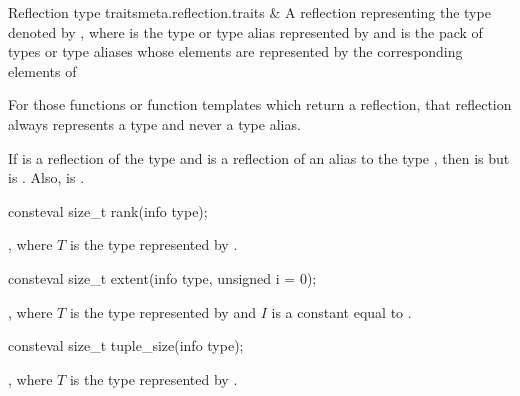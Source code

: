 \begin{libreqtab2b}{Reflection type traits}{meta.reflection.traits}
  &
A reflection representing the type denoted by
,
where  is the type or type alias represented by 
and  is the pack of types or type aliases
whose elements are represented by the corresponding elements of 
\\
\end{libreqtab2b}

\pnum
\begin{note}
For those functions or function templates which return a reflection,
that reflection always represents a type and never a type alias.
\end{note}

\pnum
\begin{note}
If  is a reflection of the type 
and  is a reflection of an alias to the type ,
then  is 
but  is .
Also,  is .
\end{note}

%
\begin{itemdecl}
consteval size_t rank(info type);
\end{itemdecl}

\begin{itemdescr}
\pnum
\returns
{},
where $T$ is the type represented by .
\end{itemdescr}

%
\begin{itemdecl}
consteval size_t extent(info type, unsigned i = 0);
\end{itemdecl}

\begin{itemdescr}
\pnum
\returns
{},
where $T$ is the type represented by 
and $I$ is a constant equal to .
\end{itemdescr}

%
\begin{itemdecl}
consteval size_t tuple_size(info type);
\end{itemdecl}

\begin{itemdescr}
\pnum
\returns
{},
where $T$ is the type represented by .
\end{itemdescr}

